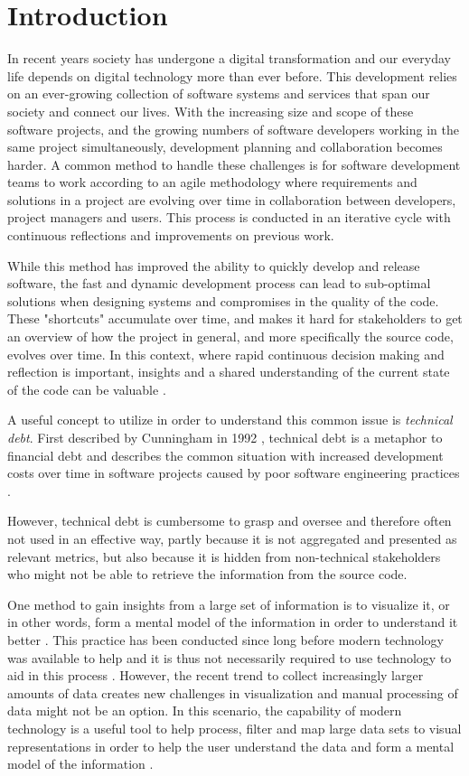 \section{Introduction}
In recent years society has undergone a digital transformation and our everyday life depends on digital technology more than ever before. 
This development relies on an ever-growing collection of software systems and services that span our society and connect our lives. 
With the increasing size and scope of these software projects, and the growing numbers of software developers working in the same project simultaneously, development planning and collaboration becomes harder.
A common method to handle these challenges is for software development teams to work according to an agile methodology \cite{hazzan_agile_2014} where requirements and solutions in a project are evolving over time in collaboration between developers, project managers and users. 
This process is conducted in an iterative cycle with continuous reflections and improvements on previous work.

While this method has improved the ability to quickly develop and release software, the fast and dynamic development process can lead to sub-optimal solutions when designing systems and compromises in the quality of the code. 
These "shortcuts" accumulate over time, and makes it hard for stakeholders to get an overview of how the project in general, and more specifically the source code, evolves over time.
In this context, where rapid continuous decision making and reflection is important, insights and a shared understanding of the current state of the code can be valuable \cite{ball_if_1997}.

A useful concept to utilize in order to understand this common issue is \textit{technical debt}.
First described by Cunningham in 1992 \cite{cunningham_wycash_1992}, technical debt is a metaphor to financial debt and describes the common situation with increased development costs over time in software projects caused by poor software engineering practices \cite{tom_exploration_2013}.

However, technical debt is cumbersome to grasp and oversee and therefore often not used in an effective way, partly because it is not aggregated and presented as relevant metrics, but also because it is hidden from non-technical stakeholders who might not be able to retrieve the information from the source code.

One method to gain insights from a large set of information is to visualize it, or in other words, form a mental model of the information in order to understand it better \cite{spence_information_2014}. 
This practice has been conducted since long before modern technology was available to help and it is thus not necessarily required to use technology to aid in this process \cite{friendly_brief_2008}. 
However, the recent trend to collect increasingly larger amounts of data creates new challenges in visualization and manual processing of data might not be an option. 
In this scenario, the capability of modern technology is a useful tool to help process, filter and map large data sets to visual representations in order to help the user understand the data and form a mental model of the information \cite{card_structure_1997}.
